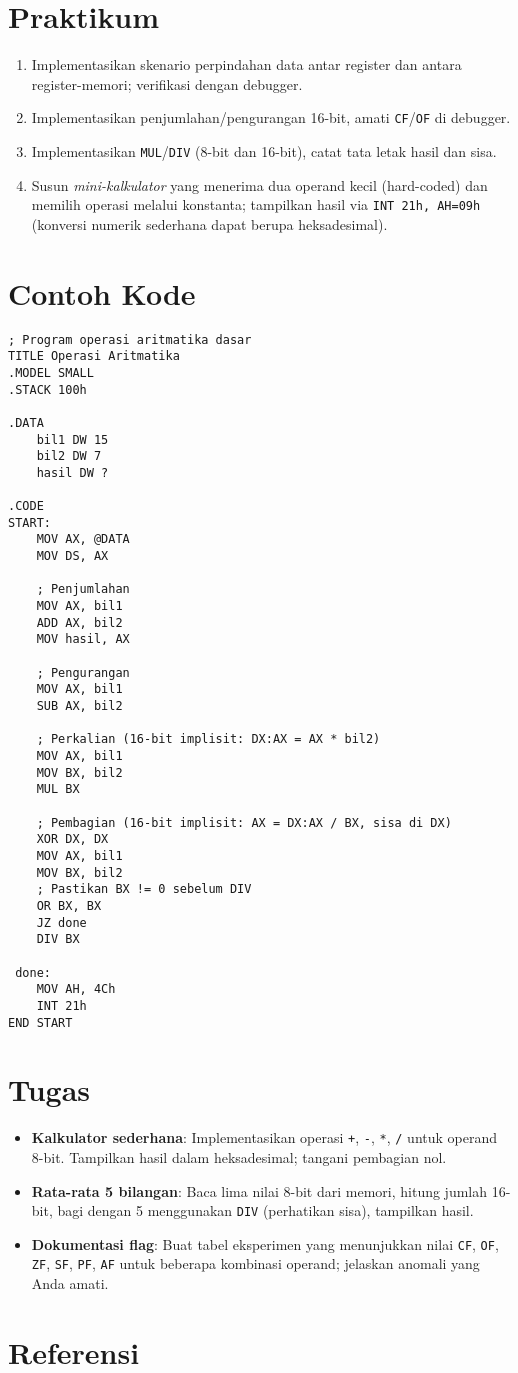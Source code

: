 \section{Praktikum}
\begin{enumerate}
  \item Implementasikan skenario perpindahan data antar register dan antara register-memori; verifikasi dengan debugger.
  \item Implementasikan penjumlahan/pengurangan 16-bit, amati \texttt{CF}/\texttt{OF} di debugger.
  \item Implementasikan \texttt{MUL}/\texttt{DIV} (8-bit dan 16-bit), catat tata letak hasil dan sisa.
  \item Susun \textit{mini-kalkulator} yang menerima dua operand kecil (hard-coded) dan memilih operasi melalui konstanta; tampilkan hasil via \texttt{INT 21h, AH=09h} (konversi numerik sederhana dapat berupa heksadesimal).
\end{enumerate}

\section{Contoh Kode}
\begin{verbatim}
; Program operasi aritmatika dasar
TITLE Operasi Aritmatika
.MODEL SMALL
.STACK 100h

.DATA
    bil1 DW 15
    bil2 DW 7
    hasil DW ?

.CODE
START:
    MOV AX, @DATA
    MOV DS, AX
    
    ; Penjumlahan
    MOV AX, bil1
    ADD AX, bil2
    MOV hasil, AX
    
    ; Pengurangan
    MOV AX, bil1
    SUB AX, bil2
    
    ; Perkalian (16-bit implisit: DX:AX = AX * bil2)
    MOV AX, bil1
    MOV BX, bil2
    MUL BX
    
    ; Pembagian (16-bit implisit: AX = DX:AX / BX, sisa di DX)
    XOR DX, DX
    MOV AX, bil1
    MOV BX, bil2
    ; Pastikan BX != 0 sebelum DIV
    OR BX, BX
    JZ done
    DIV BX

 done:
    MOV AH, 4Ch
    INT 21h
END START
\end{verbatim}

\section{Tugas}
\begin{itemize}
  \item \textbf{Kalkulator sederhana}: Implementasikan operasi \texttt{+}, \texttt{-}, \texttt{*}, \texttt{/} untuk operand 8-bit. Tampilkan hasil dalam heksadesimal; tangani pembagian nol.
  \item \textbf{Rata-rata 5 bilangan}: Baca lima nilai 8-bit dari memori, hitung jumlah 16-bit, bagi dengan 5 menggunakan \texttt{DIV} (perhatikan sisa), tampilkan hasil.
  \item \textbf{Dokumentasi flag}: Buat tabel eksperimen yang menunjukkan nilai \texttt{CF}, \texttt{OF}, \texttt{ZF}, \texttt{SF}, \texttt{PF}, \texttt{AF} untuk beberapa kombinasi operand; jelaskan anomali yang Anda amati.
\end{itemize}

\section{Referensi}

